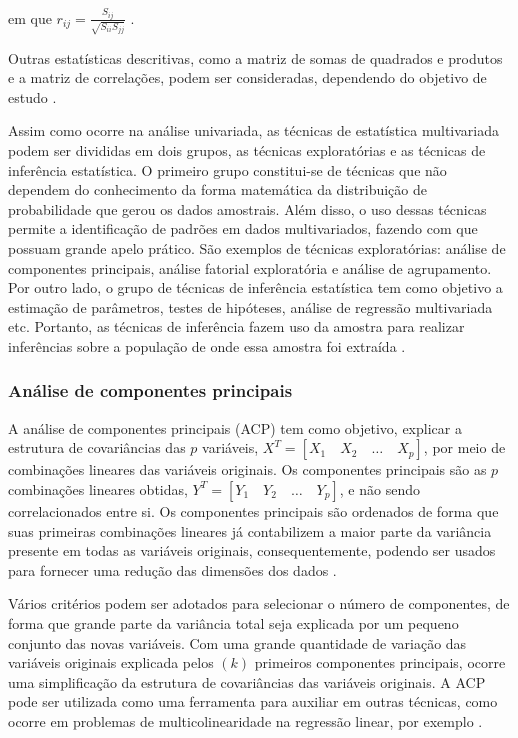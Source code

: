 \documentclass[12pt,a4paper]{article}
\begin{document}
\noindent em que $r_{ij} = \frac{S_{ij}}{\sqrt{S_{ii} S_{jj}}}$ \cite{ferreira11_g}.  
	
\vspace{0.15cm} %
	
Outras estatísticas descritivas, como a matriz de somas de quadrados e produtos e a matriz de correlações, podem ser consideradas, dependendo do objetivo de estudo \cite{ferreira11_g}.
	
Assim como ocorre na análise univariada, as técnicas de estatística multivariada podem ser divididas em dois grupos, as técnicas exploratórias e as técnicas de inferência estatística. O primeiro grupo constitui-se de técnicas que não dependem do conhecimento da forma matemática da distribuição de probabilidade que gerou os dados amostrais. Além disso, o uso dessas técnicas permite a identificação de padrões em dados multivariados, fazendo com que possuam grande apelo prático. São exemplos de técnicas exploratórias: análise de componentes principais, análise fatorial exploratória e análise de agrupamento. Por outro lado, o grupo de técnicas de inferência estatística tem como objetivo a estimação de parâmetros, testes de hipóteses, análise de regressão multivariada etc.  Portanto, as técnicas de inferência fazem uso da amostra para realizar inferências sobre a população de onde essa amostra foi extraída \cite{mingoti10}.
	
\subsubsection{Análise de componentes principais} \label{ACP} 
	
A análise de componentes principais (ACP) tem como objetivo, explicar a estrutura de covariâncias das $p$ variáveis, $X^T = [X_1 \quad X_2 \quad \dots \quad X_p]$, por meio de combinações lineares das variáveis originais. Os componentes principais são as $p$ combinações lineares obtidas, $Y^T = [Y_1 \quad Y_2 \quad \dots \quad Y_p]$, e não sendo correlacionados entre si. Os componentes principais são ordenados de forma que suas primeiras combinações lineares já contabilizem a maior parte da variância presente em todas as variáveis originais, consequentemente, podendo ser usados para fornecer uma redução das dimensões dos dados \cite{mingoti10, everitt11}.
	
Vários critérios podem ser adotados para selecionar o número de componentes, de forma que grande parte da variância total seja explicada por um pequeno conjunto das novas variáveis. Com  uma grande quantidade de variação das variáveis originais explicada pelos $(k)$ primeiros componentes principais, ocorre uma simplificação da estrutura de covariâncias das variáveis originais. A ACP pode ser utilizada como uma ferramenta para auxiliar em outras técnicas, como ocorre em problemas de multicolinearidade na regressão linear, por exemplo \cite{ferreira11_g}.
	
\end{document}
